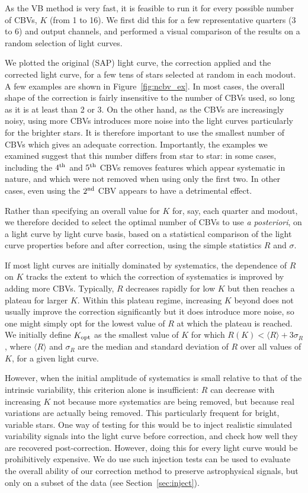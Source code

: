 \documentclass[useAMS,usenatbib]{mn2e}
\begin{document}
As the VB method is very fast, it is feasible to run it for every possible
number of CBVs, $K$ (from 1 to 16). We first did this for a few
representative quarters (3 to 6) and output
channels, and performed a visual comparison of the results on a random
selection of light curves. 

We plotted the original (SAP) light curve, the correction
applied and the corrected light curve, for a few tens of stars
selected at random in each modout. A few examples are shown in
Figure~\ref{fig:ncbv_ex}. In most cases, the overall
shape of the correction is fairly insensitive to the number of CBVs
used, so long as it is at least than 2 or 3. On the other hand, as the
CBVs are increasingly noisy, using more CBVs introduces more noise
into the light curves particularly for the brighter stars. It is
therefore important to use the smallest number of CBVs which gives an
adequate correction. Importantly, the examples we examined 
suggest that this number differs from star to star: in some cases,
including the $4^{\rm th}$ and $5^{\rm th}$ CBVs removes features
which appear systematic in nature, and which were not removed when
using only the first two. In other cases, even using the $2^{\rm nd}$ CBV
appears to have a detrimental effect.

Rather than specifying an overall value for $K$ for, say, each
quarter and modout, we therefore decided to select the optimal number
of CBVs to use \textit{a posteriori}, on a light curve by light curve basis,
based on a statistical comparison of the light curve properties before
and after correction, using the simple statistics $R$ and $\sigma$. 

If most light curves are
initially dominated by systematics, the dependence of $R$ on $K$
tracks the extent to which the correction of systematics is improved
by adding more CBVs. Typically, $R$ decreases rapidly for low $K$ but
then reaches a plateau for larger $K$. Within this plateau regime, increasing
$K$ beyond does not usually improve the correction
significantly but it does introduce more noise, so one might simply
opt for the lowest value of $R$ at which the plateau is
reached. We initially define $K_{\rm opt}$ as the smallest value of $K$ for which $R(K)
< \langle R \rangle + 3 \sigma_R$, where $\langle R \rangle$ and
$\sigma_R$ are the median and standard deviation of $R$ over all
values of $K$, for a given light curve. 

However, when the initial amplitude of systematics is small relative
to that of the intrinsic variability, this criterion alone is
insufficient: $R$ can decrease with increasing $K$ not because more
systematics are being removed, but because real variations are
actually being removed. This particularly frequent for bright,
variable stars. One way of testing for this would be to inject
realistic simulated variability signals into the light curve before
correction, and check how well they are recovered
post-correction. However, doing this for every light curve would be
prohibitively expensive. We do use such injection tests can be used to
evaluate the overall ability of our correction method to preserve
astrophysical signals, but only on a subset of the data (see
Section~\ref{sec:inject}).
\end{document}
